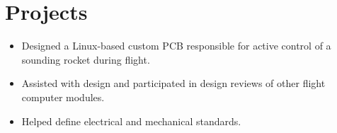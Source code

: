 \documentclass[]{deedy-resume-openfont}
\begin{document}
\begin{minipage}[t]{0.66\textwidth}






\section{Projects}

\begin{itemize}
    \setlength\itemsep{0pt}
    \item Designed a Linux-based custom PCB responsible for active control of a sounding rocket during flight.  
    \item Assisted with design and participated in design reviews of other flight computer modules.     
    \item Helped define electrical and mechanical standards.
\end{itemize}


\end{minipage}
\end{document}
